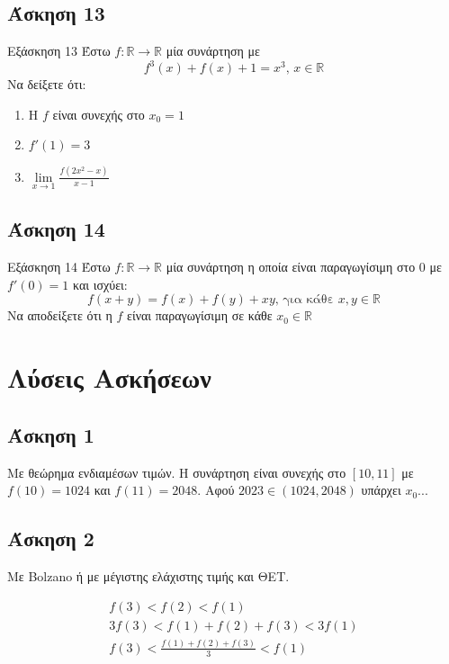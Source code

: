 \documentclass[greek]{beamer}
\begin{document}
\subsection{Άσκηση 13}
\begin{frame}[label=Άσκηση13]{Εξάσκηση 13}
 Έστω $f:\mathbb{R}\to\mathbb{R}$ μία συνάρτηση με
 $$f^3(x)+f(x)+1=x^3 \text{, } x\in\mathbb{R}$$
 Να δείξετε ότι:
 \begin{enumerate}
  \item<1-> Η $f$ είναι συνεχής στο $x_0=1$
  \item<2-> $f'(1)=3$
  \item<3-> $\lim\limits_{x \to 1}{ \frac{f(2x^2-x)}{x-1}  }$
 \end{enumerate}

\end{frame}

\subsection{Άσκηση 14}
\begin{frame}[label=Άσκηση14]{Εξάσκηση 14}
 Έστω $f:\mathbb{R}\to\mathbb{R}$ μία συνάρτηση η οποία είναι παραγωγίσιμη στο $0$ με $f'(0)=1$ και ισχύει:
 $$f(x+y)=f(x)+f(y)+xy \text{, για κάθε } x,y\in\mathbb{R}$$
 Να αποδείξετε ότι η $f$ είναι παραγωγίσιμη σε κάθε $x_0\in\mathbb{R}$

\end{frame}

\appendix
\section{Λύσεις Ασκήσεων}
\begin{frame}
 \tableofcontents
\end{frame}

\subsection{Άσκηση 1}
\begin{frame}[label=Λύση1]
 Με θεώρημα ενδιαμέσων τιμών. Η συνάρτηση είναι συνεχής στο $[10,11]$ με $f(10)=1024$ και $f(11)=2048$. Αφού $2023\in (1024,2048)$ υπάρχει $x_0$...

 \hyperlink{Άσκηση1}{}
\end{frame}

\subsection{Άσκηση 2}
\begin{frame}[label=Λύση2]
 Με Bolzano ή με μέγιστης ελάχιστης τιμής και ΘΕΤ.

 \begin{gather*}
  f(3)<f(2)<f(1) \\
  3f(3)<f(1)+f(2)+f(3)<3f(1) \\
  f(3)<\frac{f(1)+f(2)+f(3)}{3}<f(1)
 \end{gather*}

 \hyperlink{Άσκηση2}{}
\end{frame}
\end{document}
